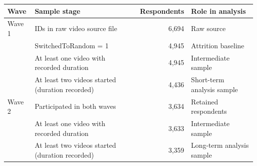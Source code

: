 
\begin{tabular}{llrl}
\toprule
Wave & Sample stage & Respondents & Role in analysis\\
\midrule
Wave 1 & IDs in raw video source file & 6,694 & Raw source\\
 & SwitchedToRandom = 1 & 4,945 & Attrition baseline\\
 & At least one video with recorded duration & 4,945 & Intermediate sample\\
 & At least two videos started (duration recorded) & 4,436 & Short-term analysis sample\\
Wave 2 & Participated in both waves & 3,634 & Retained respondents\\
 & At least one video with recorded duration & 3,633 & Intermediate sample\\
 & At least two videos started (duration recorded) & 3,359 & Long-term analysis sample\\
\bottomrule
\end{tabular}
